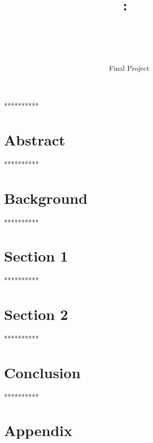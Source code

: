 \documentclass{article}
\title{\textmd{\textbf{\Class:\ \Title}}\\\normalsize\vspace{0.1in}\small{ \Date}\\\vspace{0.1in}\large{\textit{\ClassInstructor\ \ClassTime}}}
\author{\textbf{\AuthorName}}
\date{Final Project}
\begin{document}
\maketitle

\bigskip
\centerline{**********}

\noindent \section*{Abstract}


\centerline{**********}

\noindent \section*{Background}

\centerline{**********}

\noindent \section*{Section 1}


\bigskip
\centerline{**********}

\noindent \section*{Section 2}

\bigskip
\centerline{**********}

\noindent \section*{Conclusion}

\bigskip
\centerline{**********}


\noindent \section*{Appendix}

%

%

\end{document}
